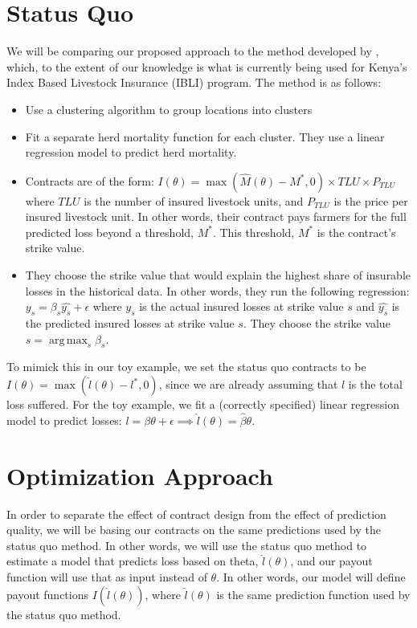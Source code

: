 \documentclass[11pt]{article}
\DeclareMathOperator*{\argmax}{arg\,max}
\begin{document}
\section{Status Quo}
We will be comparing our proposed approach to the method developed by \cite{chantarat2013designing}, which, to the extent of our knowledge is what is currently being used for Kenya's Index Based Livestock Insurance (IBLI) program. The method is as follows: 
\begin{itemize}
    \item Use a clustering algorithm to group locations into clusters
    \item Fit a separate herd mortality function for each cluster. They use a linear regression model to predict herd mortality. 
    \item Contracts are of the form: $I(\theta) = \max(\hat{M}(\theta)-M^*,0)\times TLU \times P_{TLU}$ where $TLU$ is the number of insured livestock units, and $P_{TLU}$ is the price per insured livestock unit. In other words, their contract pays farmers for the full predicted loss beyond a threshold, $M^*$. This threshold, $M^*$ is the contract's strike value. 
    \item They choose the strike value that would explain the highest share of insurable losses in the historical data. In other words, they run the following regression: $y_s = \beta_s \hat{y_s}+\epsilon$ where $y_s$ is the actual insured losses at strike value $s$ and $\hat{y_s}$ is the predicted insured losses at strike value $s$. They choose the strike value $s= \argmax_s \beta_s$. 
\end{itemize}

To mimick this in our toy example, we set the status quo contracts to be $I(\theta) = \max(\hat{l}(\theta)-l^*,0)$, since we are already assuming that $l$ is the total loss suffered. For the toy example, we fit a (correctly specified) linear regression model to predict losses: $l = \beta \theta + \epsilon \implies \hat{l}(\theta) = \hat{\beta}\theta$. 

\section{Optimization Approach}
In order to separate the effect of contract design from the effect of prediction quality, we will be basing our contracts on the same predictions used by the status quo method. In other words, we will use the status quo method to estimate a model that predicts loss based on theta, $\hat{l}(\theta)$, and our payout function will use that as input instead of $\theta$. In other words, our model will define payout functions $I(\hat{l}(\theta))$, where $\hat{l}(\theta)$ is the same prediction function used by the status quo method. 
\end{document}
